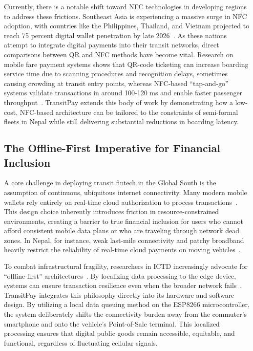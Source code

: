 \documentclass[manuscript,review,anonymous]{acmart}
\begin{document}
Currently, there is a notable shift toward NFC technologies in developing regions to address these frictions. Southeast Asia is experiencing a massive surge in NFC adoption, with countries like the Philippines, Thailand, and Vietnam projected to reach 75 percent digital wallet penetration by late 2026~\cite{juniper2022digital}. As these nations attempt to integrate digital payments into their transit networks, direct comparisons between QR and NFC methods have become vital. Research on mobile fare payment systems shows that QR-code ticketing can increase boarding service time due to scanning procedures and recognition delays, sometimes causing crowding at transit entry points, whereas NFC-based ``tap-and-go'' systems validate transactions in around 100-120 ms and enable faster passenger throughput~\cite{chen2020influence}. TransitPay extends this body of work by demonstrating how a low-cost, NFC-based architecture can be tailored to the constraints of semi-formal fleets in Nepal while still delivering substantial reductions in boarding latency.

\subsection{The Offline-First Imperative for Financial Inclusion}
A core challenge in deploying transit fintech in the Global South is the assumption of continuous, ubiquitous internet connectivity. Many modern mobile wallets rely entirely on real-time cloud authorization to process transactions~\cite{townsend2019distributed}. This design choice inherently introduces friction in resource-constrained environments, creating a barrier to true financial inclusion for users who cannot afford consistent mobile data plans or who are traveling through network dead zones. In Nepal, for instance, weak last-mile connectivity and patchy broadband heavily restrict the reliability of real-time cloud payments on moving vehicles~\cite{kharel2025digital}. 

To combat infrastructural fragility, researchers in ICTD increasingly advocate for ``offline-first'' architectures~\cite{iyengar2024edge}. By localizing data processing to the edge device, systems can ensure transaction resilience even when the broader network fails~\cite{iyengar2024edge}. TransitPay integrates this philosophy directly into its hardware and software design. By utilizing a local data queuing method on the ESP8266 microcontroller, the system deliberately shifts the connectivity burden away from the commuter's smartphone and onto the vehicle's Point-of-Sale terminal. This localized processing ensures that digital public goods remain accessible, equitable, and functional, regardless of fluctuating cellular signals.
\end{document}
